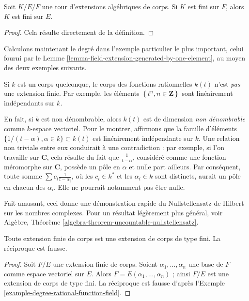 \begin{lemma}
\label{lemma-finite-goes-up}
Soit $K/E/F$ une tour d'extensions algébriques de corps.
Si $K$ est fini sur $F$, alors $K$ est fini sur $E$.
\end{lemma}

\begin{proof}
Cela résulte directement de la définition.
\end{proof}

\noindent
Calculons maintenant le degré dans l'exemple particulier le plus important, celui
fourni par le Lemme \ref{lemma-field-extension-generated-by-one-element}, au moyen
des deux exemples suivants.

\begin{example}
\label{example-degree-rational-function-field}
Si $k$ est un corps quelconque, le corps des fonctions rationnelles $k(t)$ n'est
{\it pas} une extension finie. Par exemple, les éléments
$\left\{t^n, n \in \mathbf{Z}\right\}$ sont linéairement indépendants sur $k$.

\medskip\noindent
En fait, si $k$ est non dénombrable, alors $k(t)$ est de dimension {\it non dénombrable}
comme $k$-espace vectoriel. Pour le montrer, affirmons que la famille d'éléments
$\{1/(t- \alpha), \alpha \in k\} \subset k(t)$ est linéairement indépendante sur
$k$. Une relation non triviale entre eux conduirait à une contradiction : par
exemple, si l'on travaille sur $\mathbf{C}$, cela résulte du fait que
$\frac{1}{t-\alpha}$, considéré comme une fonction méromorphe sur
$\mathbf{C}$, possède un pôle en $\alpha$ et nulle part ailleurs.
Par conséquent, toute somme $\sum c_i \frac{1}{t - \alpha_i}$, où les $c_i \in k^*$
et les $\alpha_i \in k$ sont distincts, aurait un pôle en chacun des $\alpha_i$.
Elle ne pourrait notamment pas être nulle.

\medskip\noindent
Fait amusant, ceci donne une démonstration rapide du Nullstellensatz de Hilbert sur
les nombres complexes. Pour un résultat légèrement plus général, voir
Algèbre, Théorème \ref{algebra-theorem-uncountable-nullstellensatz}.
\end{example}

\begin{lemma}
\label{lemma-finite-finitely-generated}
Toute extension finie de corps est une extension de corps de type fini.
La réciproque est fausse.
\end{lemma}

\begin{proof}
Soit $F/E$ une extension finie de corps. Soient $\alpha_1, \ldots, \alpha_n$
une base de $F$ comme espace vectoriel sur $E$. Alors
$F = E(\alpha_1, \ldots, \alpha_n)$ ; ainsi $F/E$ est une extension de corps
de type fini. La réciproque est fausse d'après
l'Exemple \ref{example-degree-rational-function-field}.
\end{proof}

